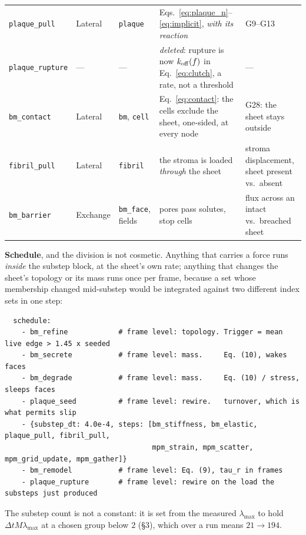 \documentclass[10pt,a4paper]{article}
\newcommand{\code}[1]{\texttt{#1}}
\newcommand{\op}[1]{\texttt{#1}}
\begin{document}
\begin{center}
\begin{tabular}{@{}lllp{4.3cm}p{3.4cm}@{}}
\op{plaque\_pull}   & Lateral & \code{plaque}   & Eqs.~\eqref{eq:plaque_n}--\eqref{eq:implicit},
  \emph{with its reaction} & G9--G13\\
\op{plaque\_rupture}& --- & --- & \emph{deleted}: rupture is now $k_{\rm off}(f)$ in
  Eq.~\eqref{eq:clutch}, a rate, not a threshold & ---\\
\op{bm\_contact}    & Lateral & \code{bm}, \code{cell} & Eq.~\eqref{eq:contact}: the cells exclude the
  sheet, one-sided, at every node & G28: the sheet stays outside\\
\op{fibril\_pull}   & Lateral & \code{fibril}   & the stroma is loaded \emph{through} the sheet
  \cite{keene1987} & stroma displacement, sheet present vs.\ absent\\
\op{bm\_barrier}    & Exchange& \code{bm\_face}, fields & pores pass solutes, stop cells
  \cite{yurchenco2011} & flux across an intact vs.\ breached sheet\\
\bottomrule
\end{tabular}
\end{center}

\textbf{Schedule}, and the division is not cosmetic. Anything that carries a force runs \emph{inside}
the substep block, at the sheet's own rate; anything that changes the sheet's topology or its mass runs
once per frame, because a set whose membership changed mid-substep would be integrated against two
different index sets in one step:

\smallskip
{\footnotesize
\begin{verbatim}
  schedule:
    - bm_refine            # frame level: topology. Trigger = mean live edge > 1.45 x seeded
    - bm_secrete           # frame level: mass.     Eq. (10), wakes faces
    - bm_degrade           # frame level: mass.     Eq. (10) / stress, sleeps faces
    - plaque_seed          # frame level: rewire.   turnover, which is what permits slip
    - {substep_dt: 4.0e-4, steps: [bm_stiffness, bm_elastic, plaque_pull, fibril_pull,
                                   mpm_strain, mpm_scatter, mpm_grid_update, mpm_gather]}
    - bm_remodel           # frame level: Eq. (9), tau_r in frames
    - plaque_rupture       # frame level: rewire on the load the substeps just produced
\end{verbatim}}
\smallskip

The substep count is not a constant: it is set from the measured $\lambda_{\max}$ to hold
$\Delta t M\lambda_{\max}$ at a chosen group below $2$ (\S3), which over a run means $21\to194$.
\end{document}
